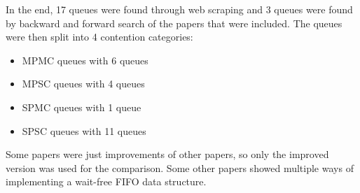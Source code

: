 In the end, 17 queues were found through web scraping and 3 queues were found by backward and forward search of the papers that were included. The queues were then split into 4 contention categories:
\begin{itemize}
   \item \ac{MPMC} queues with 6 queues \cite{Kogan2011WaitFreeQueues,FeldmanDechevV2,RamalheteQueue,Verma2013Scalable,FastFetchAndAddWaitFreeQueue,wCQWaitFreeQueue}
   \item \ac{MPSC} queues with 4 queues \cite{WangCacheCoherent,jiffy,JayantiLog,Drescher2015GuardedSections}
   \item \ac{SPMC} queues with 1 queue \cite{Mateíspmc}
   \item \ac{SPSC} queues with 11 queues \cite{Lamport1983SPSCCircularBuffer,torquati2010singleproducersingleconsumerqueuessharedcache,Wang2013BQueue,MaffioneCacheAware,ffq,JayantiLog}
\end{itemize}
Some papers were just improvements of other papers, so only the improved version was used for the comparison. Some other papers showed multiple ways of implementing a wait-free \ac{FIFO} data structure.